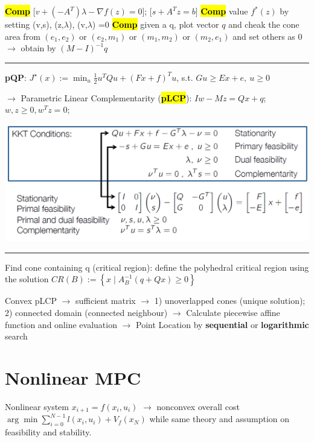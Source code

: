 \documentclass[10pt,a4paper,landscape]{article}
\newcommand{\hlc}[2][yellow]{ {\sethlcolor{#1} \hl{#2}} }
\newcommand{\quadRule}{\vspace{-3pt}\rule{0.23\textwidth}{0.4pt}}
\newcommand{\comp}{\footnotesize{\hlc[cyan]{\textbf{Comp}}}} %
\begin{document}
\begin{multicols*}{4}
\comp [$v + (-A^T)\lambda -\nabla f(z)=0$]; [$s + A^Tz = b $]
\comp value $f^*(z)$ by setting (v,s), (z,$\lambda$), (v,$\lambda$) =0
\comp given a q, plot vector $q$ and cheak the cone area from $(e_1, e_2)$ or $(e_2, m_1)$ or $(m_1, m_2)$ or $(m_2, e_1)$ and set others as 0 $\rightarrow$ obtain by $(M-I)^{-1}q$

\quadRule

\textbf{pQP}: $J^{\star}(x):=\min _{u} \frac{1}{2} u^{T} Q u+(F x+f)^{T} u$, s.t.  $G u \geq E x+e,\  u \geq 0$

$\rightarrow$ Parametric Linear Complementarity (\hl{\textbf{pLCP}}): $Iw-M z=Q x+q $; $w, z \geq 0, w^{T} z=0$;
\vspace{-5pt}
\begin{colfig}
    \centering
    \includegraphics[width=\linewidth]{images/mpcKKT.png}
    \vspace{-16pt}
\end{colfig}

\quadRule

Find cone containing q (critical region): define the polyhedral critical region using the solution $C R(B):=\left\{x \mid A_{B}^{-1}(q+Q x) \geq 0\right\}$

Convex pLCP $\rightarrow$ sufficient matrix $\rightarrow$ 1) unoverlapped cones (unique solution); 2) connected domain (connected neighbour) $\rightarrow$ 
Calculate piecewise affine function and online evaluation $\rightarrow$ Point Location by \textbf{sequential} or \textbf{logarithmic} search


\section{Nonlinear MPC}

Nonlinear system $x_{i+1}=f\left(x_{i}, u_{i}\right)$ $\rightarrow$ nonconvex overall cost $\arg\min \sum_{i=0}^{N-1} l\left(x_{i}, u_{i}\right)+V_{f}\left(x_{N}\right)$ while same theory and assumption on feasibility and stability.


\end{multicols*}
\end{document}
